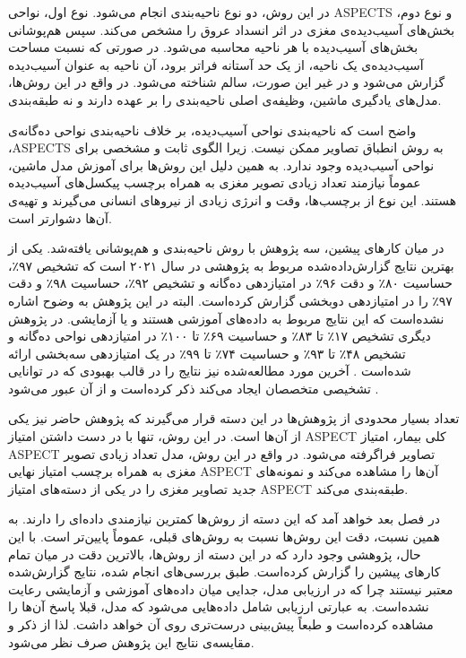 در این روش، دو نوع ناحیه‌بندی انجام می‌شود.
نوع اول، نواحی ASPECTS و نوع دوم،
بخش‌های آسیب‌دیده‌ی مغزی در اثر انسداد عروق 
را مشخص می‌کند.
سپس هم‌پوشانی بخش‌های آسیب‌دیده با هر ناحیه محاسبه می‌شود.
در صورتی که نسبت مساحت آسیب‌دیده‌ی یک ناحیه، از یک حد آستانه فراتر برود، آن ناحیه به عنوان آسیب‌دیده گزارش می‌شود و در غیر این صورت، سالم شناخته می‌شود.
در واقع در این روش‌ها، مدل‌های یادگیری ماشین، وظیفه‌ی اصلی ناحیه‌بندی را بر عهده دارند و نه طبقه‌بندی.

واضح است که ناحیه‌بندی نواحی آسیب‌دیده، بر خلاف ناحیه‌بندی نواحی ده‌گانه‌ی ،ASPECTS
به روش انطباق تصاویر ممکن نیست.
زیرا الگوی ثابت و مشخصی برای نواحی آسیب‌دیده وجود ندارد.
به همین دلیل این روش‌ها برای آموزش مدل ماشین، عموماً نیازمند تعداد زیادی تصویر مغزی به همراه برچسب پیکسل‌های آسیب‌دیده هستند.
این نوع از برچسب‌ها، وقت و انرژی زیادی از نیرو‌های انسانی می‌گیرند و تهیه‌ی آن‌ها دشوارتر است.


در میان کارهای پیشین،
سه پژوهش با
روش ناحیه‌بندی و هم‌پوشانی
یافته‌شد.
یکی از بهترین نتایج 
گزارش‌داده‌شده مربوط به پژوهشی در سال ۲۰۲۱ است
\cite{naganuma2021alberta}
که
تشخیص
۹۷٪،
حساسیت
۸۰٪
و دقت 
۹۶٪
در امتیازدهی ده‌گانه و 
تشخیص
۹۲٪،
حساسیت
۹۸٪
و دقت 
۹۷٪
را
در امتیازدهی دوبخشی 
گزارش کرده‌است.
البته در این پژوهش به وضوح اشاره نشده‌است که این نتایج مربوط به داده‌های آموزشی هستند و یا آزمایشی.
در پژوهش دیگری
تشخیص
۱۷٪
تا
۸۳٪
و
حساسیت
۶۹٪
تا
۱۰۰٪
در امتیازدهی نواحی ده‌گانه و 
تشخیص
۴۸٪
تا
۹۳٪
و
حساسیت
۷۴٪
تا
۹۹٪
در یک امتیازدهی سه‌بخشی 
ارائه شده‌است \cite{naganuma2021alberta}.
آخرین مورد مطالعه‌شده نیز نتایج را در قالب 
بهبودی که در توانایی تشخیصی متخصصان ایجاد می‌کند ذکر کرده‌است و از آن عبور می‌شود \cite{chen2022improving}.

تعداد بسیار محدودی از پژوهش‌ها در این دسته قرار می‌گیرند
که پژوهش حاضر نیز یکی از آن‌ها است.
در این روش، تنها با در دست داشتن امتیاز ASPECT کلی بیمار، امتیاز ASPECT تصاویر فراگرفته می‌شود.
در واقع در این روش، مدل تعداد زیادی تصویر مغزی به همراه برچسب امتیاز نهایی ASPECT آن‌ها را مشاهده می‌کند و 
نمونه‌های جدید تصاویر مغزی را در یکی از دسته‌های امتیاز
ASPECT
طبقه‌بندی می‌کند.

در فصل بعد خواهد آمد که این دسته از روش‌ها کمترین نیاز‌مندی داده‌ای را دارند.
به همین نسبت، دقت این روش‌ها نسبت به روش‌های قبلی، عموماً پایین‌تر است.
با این حال، پژوهشی
\cite{golkonda2022automated}
وجود دارد که در این دسته از روش‌ها، بالاترین دقت 
در میان تمام کارهای پیشین
را گزارش کرده‌است.
طبق بررسی‌های انجام شده، نتایج گزارش‌شده معتبر نیستند
چرا که در ارزیابی مدل، جدایی میان داده‌های آموزشی و آزمایشی رعایت نشده‌است.
به عبارتی ارزیابی شامل داده‌هایی می‌شود که مدل، قبلا پاسخ آن‌ها را مشاهده کرده‌است و طبعاً پیش‌بینی درست‌تری روی آن خواهد داشت.
لذا از ذکر و مقایسه‌ی نتایج این پژوهش صرف نظر می‌شود.

